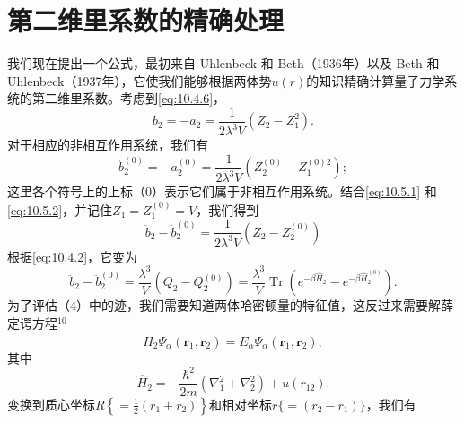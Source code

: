 \section{第二维里系数的精确处理}\label{ux7b2cux4e8cux7ef4ux91ccux7cfbux6570ux7684ux7cbeux786eux5904ux7406}
我们现在提出一个公式，最初来自 Uhlenbeck 和 Beth（1936年）以及 Beth 和 Uhlenbeck（1937年），它使我们能够根据两体势\(u(r)\)的知识精确计算量子力学系统的第二维里系数。考虑到\autoref{eq:10.4.6}，
\begin{equation}\tag{10.5.1}\label{eq:10.5.1}
\dot { b } _ { 2 } = - a _ { 2 } = \frac { 1 } { 2 \lambda ^{3} V } \left( Z _ { 2 } - Z _ { 1 } ^{2} \right) .
\end{equation}
对于相应的非相互作用系统，我们有
\begin{equation}\tag{10.5.2}\label{eq:10.5.2}
\ddot { b } _ { 2 } ^{( 0 )} = - a _ { 2 } ^{( 0 )} = \frac { 1 } { 2 \lambda ^{3} V } \left( Z _ { 2 } ^{( 0 )} - Z _ { 1 } ^{( 0 ) 2} \right) ;
\end{equation}
这里各个符号上的上标（0）表示它们属于非相互作用系统。结合\autoref{eq:10.5.1} 和 \autoref{eq:10.5.2}，并记住\(Z_{1}=Z_{1}^{(0)}=V\)，我们得到
\begin{equation}\tag{10.5.3}\label{eq:10.5.3}
\ddot { b } _ { 2 } - \ddot { b } _ { 2 } ^{( 0 )} = \frac { 1 } { 2 \lambda ^{3} V } \left( Z _ { 2 } - Z _ { 2 } ^{( 0 )} \right)
\end{equation}
根据\autoref{eq:10.4.2}，它变为
\begin{equation}\tag{10.5.4}\label{eq:10.5.4}
\ddot { b } _ { 2 } - \ddot { b } _ { 2 } ^{( 0 )} = \frac { \lambda ^{3} } { V } \left( Q _ { 2 } - Q _ { 2 } ^{( 0 )} \right) = \frac { \lambda ^{3} } { V } \operatorname { T r } \left( e ^{- \beta \hat { H} _ { 2 } } - e ^{- \beta \hat { H} _ { 2 } ^{( 0 )} } \right) .
\end{equation}
为了评估（4）中的迹，我们需要知道两体哈密顿量的特征值，这反过来需要解薛定谔方程\(^{10}\)
\begin{equation}\tag{10.5.5}\label{eq:10.5.5}
\hat { H } _ { 2 } \Psi _ { \alpha } ( \pmb { r } _ { 1 } , \pmb { r } _ { 2 } ) = E _ { \alpha } \Psi _ { \alpha } ( \pmb { r } _ { 1 } , \pmb { r } _ { 2 } ) ,
\end{equation}
其中
\begin{equation}\tag{10.5.6}\label{eq:10.5.6}
\hat { H } _ { 2 } = - \frac { \hbar ^{2} } { 2 m } \left( \nabla _ { 1 } ^{2} + \nabla _ { 2 } ^{2} \right) + u ( r _ { 12 } ) .
\end{equation}
变换到质心坐标\(R\left\{=\frac{1}{2}(r_{1}+r_{2})\right\}\)和相对坐标\(r\{=(r_{2}-r_{1})\}\)，我们有
